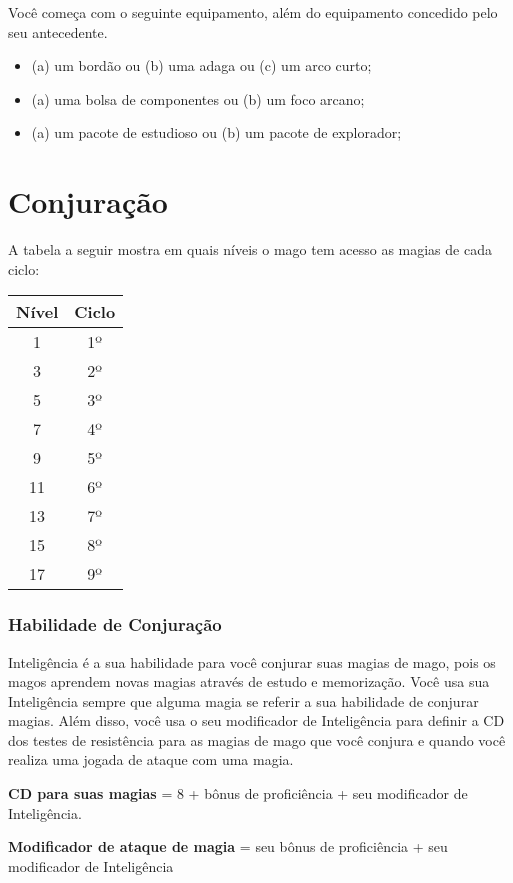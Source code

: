 \documentclass{RPG_Adventure}[2021/10/20]
\begin{document}
Você começa com o seguinte equipamento, além do equipamento concedido pelo seu
antecedente.
\begin{itemize}
    \item (a) um bordão ou (b) uma adaga ou (c) um arco curto;
    \item (a) uma bolsa de componentes ou (b) um foco arcano;
    \item (a) um pacote de estudioso ou (b) um pacote de explorador;
\end{itemize}

\section*{Conjuração}%

A tabela a seguir mostra em quais níveis o mago tem acesso as magias de cada
ciclo:

\begin{center}
\begin{tabular}{|||c||c|||}
    \hline
    \textbf{Nível} & \textbf{Ciclo} \\
    \hline
    1 & 1º \\
    \hline
    3 & 2º \\
    \hline
    5 & 3º \\
    \hline
    7 & 4º \\
    \hline
    9 & 5º \\
    \hline
    11 & 6º \\
    \hline
    13 & 7º \\
    \hline
    15 & 8º \\
    \hline
    17 & 9º \\
    \hline
\end{tabular}
\end{center}

\subsubsection*{Habilidade de Conjuração}%

Inteligência é a sua habilidade para você conjurar suas magias de mago, pois os
magos aprendem novas magias através de estudo e memorização. Você usa sua
Inteligência sempre que alguma magia se referir a sua habilidade de conjurar
magias. Além disso, você usa o seu modificador de Inteligência para definir a CD
dos testes de resistência para as magias de mago que você conjura e quando você
realiza uma jogada de ataque com uma magia.

\begin{center}
\textbf{CD para suas magias} = 8 + bônus de proficiência + seu modificador de
Inteligência. \nl

\textbf{Modificador de ataque de magia} = seu bônus de proficiência + seu
modificador de Inteligência
\end{center}
\end{document}
